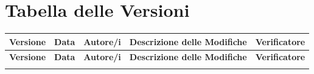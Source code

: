 \documentclass[a4paper,11pt,oneside]{scrartcl}
\begin{document}
\section*{Tabella delle Versioni}
\vspace{0.2cm}
{%
    \renewcommand{\arraystretch}{1.2}
    \setlength{\LTleft}{-0.4cm}
    \setlength{\LTright}{0pt}
    \begin{longtable}{@{}llp{}p{}p{}@{}}
        \toprule
        \textbf{Versione} & \textbf{Data} & \textbf{Autore/i}       & \textbf{Descrizione delle Modifiche}                                                                                                                     & \textbf{Verificatore}   \\
        \midrule
        \endfirsthead
        \toprule
        \textbf{Versione} & \textbf{Data} & \textbf{Autore/i}       & \textbf{Descrizione delle Modifiche}                                                                                                                     & \textbf{Verificatore}   \\
        \midrule
        \endhead
        \bottomrule
        \endfoot
        \bottomrule
        \endlastfoot


\end{longtable}}
\end{document}
